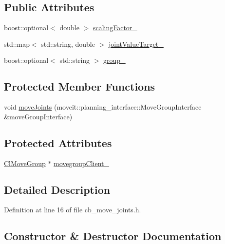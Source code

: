 \subsection*{Public Attributes}
\begin{DoxyCompactItemize}
\item 
boost\+::optional$<$ double $>$ \hyperlink{classmove__group__interface__client_1_1CbMoveJoints_a05f9ed8765ddb6e02b108a790bdf8f88}{scaling\+Factor\+\_\+}
\item 
std\+::map$<$ std\+::string, double $>$ \hyperlink{classmove__group__interface__client_1_1CbMoveJoints_a7339a7f34ba2c481b6a0821db5f1a483}{joint\+Value\+Target\+\_\+}
\item 
boost\+::optional$<$ std\+::string $>$ \hyperlink{classmove__group__interface__client_1_1CbMoveJoints_aed3fff5331aa947ec89c55945bae1afc}{group\+\_\+}
\end{DoxyCompactItemize}
\subsection*{Protected Member Functions}
\begin{DoxyCompactItemize}
\item 
void \hyperlink{classmove__group__interface__client_1_1CbMoveJoints_aa60670293a8fafcb6e091b85af722822}{move\+Joints} (moveit\+::planning\+\_\+interface\+::\+Move\+Group\+Interface \&move\+Group\+Interface)
\end{DoxyCompactItemize}
\subsection*{Protected Attributes}
\begin{DoxyCompactItemize}
\item 
\hyperlink{classmove__group__interface__client_1_1ClMoveGroup}{Cl\+Move\+Group} $\ast$ \hyperlink{classmove__group__interface__client_1_1CbMoveJoints_a9c1ffe89b25fc5693949241217d73e90}{movegroup\+Client\+\_\+}
\end{DoxyCompactItemize}


\subsection{Detailed Description}


Definition at line 16 of file cb\+\_\+move\+\_\+joints.\+h.



\subsection{Constructor \& Destructor Documentation}
\mbox{\label{classmove__group__interface__client_1_1CbMoveJoints_a946c2fd5f9b5415fa9b6a5976fe1b750}} 
